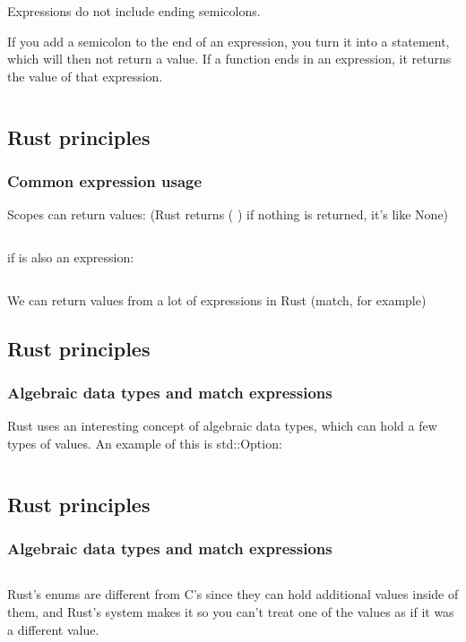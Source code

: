 \documentclass[usenames,twocolumn,dvipsnames,10pt,a4wide]{article}
\begin{document}
Expressions do not include ending semicolons.


If you add a semicolon to the end of an expression, you turn 
it into a statement, which will then not return a value.
If a function ends in an expression, it returns the value of
that expression.

\inputminted[fontsize=\normalsize]{rust}{code/expression2.rs}



\subsection{Rust principles}
\subsubsection{Common expression usage}
Scopes can return values:
(Rust returns ( ) if nothing is returned, it's like None)
\inputminted[fontsize=\normalsize]{rust}{code/expression3.rs}

if
is also an expression:
\inputminted[fontsize=\normalsize]{rust}{code/expression4.rs}

\normalsize
We can return values from a lot of expressions in Rust 
(match, for example)


\subsection{Rust principles}
\subsubsection{Algebraic data types and match expressions}
Rust uses an interesting concept of algebraic 
data types, which can hold a few types of values. 
An example of this is std::Option:

\inputminted[fontsize=\normalsize]{rust}{code/option1.rs}



\subsection{Rust principles}
\subsubsection{Algebraic data types and match expressions}
\inputminted[fontsize=\normalsize]{rust}{code/option1.rs}

\normalsize
Rust's enums are different from C's since they can hold additional
values inside of them, and Rust's system makes it so you can't
treat one of the values as if it was a different value.
\end{document}
